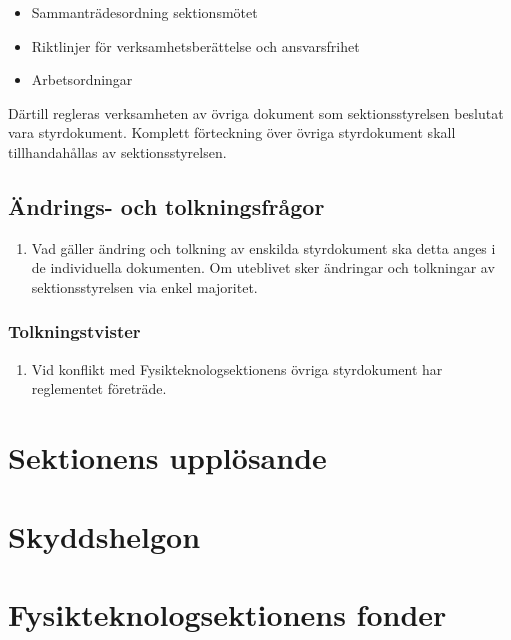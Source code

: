 \documentclass[11pt,a4paper]{article}
\begin{document}
\begin{itemize}
\item Sammanträdesordning sektionsmötet
\item Riktlinjer för verksamhetsberättelse och ansvarsfrihet
\item Arbetsordningar
\end{itemize}

Därtill regleras verksamheten av övriga dokument som sektionsstyrelsen beslutat vara styrdokument. Komplett förteckning över övriga styrdokument skall tillhandahållas av sektionsstyrelsen.

\subsection{Ändrings- och tolkningsfrågor}

\begin{enumerate}[\thesubsection .1]
\item Vad gäller ändring och tolkning av enskilda styrdokument ska detta anges i de individuella dokumenten. Om uteblivet sker ändringar och tolkningar av sektionsstyrelsen via enkel majoritet. 

\end{enumerate}

\subsubsection{Tolkningstvister}

\begin{enumerate}[\thesubsection .1]

  \item Vid konflikt med Fysikteknologsektionens övriga styrdokument har reglementet företräde.

\end{enumerate}


\newpage

\section{Sektionens upplösande}
\section{Skyddshelgon}


\section{Fysikteknologsektionens fonder}
\end{document}
